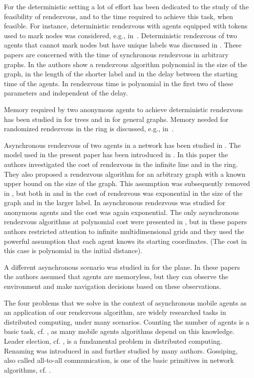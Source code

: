 \documentclass [11pt] {article}
\begin{document}
For the deterministic setting a lot of effort has been dedicated to the study of the feasibility of rendezvous, and to the time required to achieve this task, when feasible. For instance, deterministic rendezvous with agents equipped with tokens used to mark nodes was considered, e.g., in~\cite{KKSS}. Deterministic rendezvous of two agents that cannot mark nodes but have unique labels was discussed in {\cite{DFKP,KM,TSZ14}}.
These papers are concerned with the time of synchronous rendezvous in arbitrary
graphs. In \cite{DFKP} the authors show a rendezvous algorithm polynomial in the size of the graph, in the length of the shorter
label and in the delay between the starting time of the agents. In {\cite{KM,TSZ14}} rendezvous time is polynomial in the first two of these parameters and independent of the delay.

Memory required by two anonymous agents to achieve deterministic rendezvous has been studied in \cite{FP2} for trees and in  \cite{CKP} for general graphs.
Memory needed for randomized rendezvous in the ring is discussed, e.g., {in~\cite{KKPM11}}.

Asynchronous rendezvous of two agents in a network has been studied in \cite{BCGIL,CCGL,CLP,DGKKPV,GP}. The model used in the present paper has been
introduced in \cite{DGKKPV}. In this paper  the authors investigated the cost of rendezvous in the infinite line and in the ring. They also proposed a rendezvous
algorithm for an arbitrary graph with a known upper bound on the size of the graph. This assumption was subsequently removed in \cite{CLP}, but both in
 \cite{DGKKPV} and in  \cite{CLP} the cost of rendezvous was exponential in the size of the graph and in the larger label. In \cite{GP} asynchronous rendezvous was studied for anonymous agents and the cost was again exponential. The only asynchronous rendezvous algorithms at polynomial cost were
 presented in \cite{BCGIL,CCGL}, but in these papers authors restricted attention to infinite multidimensional grids and they used 
 the powerful assumption that each agent knows its starting coordinates. (The cost in this case is polynomial in the initial distance).
 
 A different asynchronous scenario was studied in \cite{CFPS,fpsw} for the plane. In these papers the authors assumed that agents are memoryless, but they can observe the environment and make navigation decisions based on these observations.
 
 The four problems that we solve in the context of asynchronous mobile agents as an application of our rendezvous algorithm, are
 widely researched tasks in distributed computing, under many scenarios. Counting the number of agents is a basic task, cf. \cite{FP3},
 as many mobile agents algorithms depend on this knowledge.  Leader election, cf. \cite{Ly},  is a fundamental problem in distributed
 computing. Renaming  was introduced in \cite{ABDKPR} and further studied by many authors. Gossiping, also called all-to-all communication,
 is one of the basic primitives in network algorithms, cf. \cite{FL}. 
\end{document}
